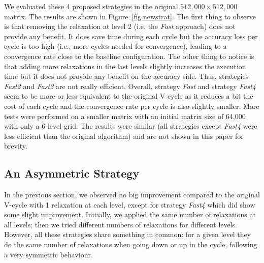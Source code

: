
We evaluated these 4 proposed strategies in the original $512,000\times
512,000$ matrix.  The results are shown in Figure~\ref{fig.newstrat}.  The
first thing to observe is that removing the relaxation at level 2 (i.e. the \emph{Fast} approach) does not
provide any benefit. It does save time during each cycle but the accuracy loss
per cycle is too high (i.e., more
cycles needed for convergence), leading to a convergence rate close to the baseline configuration. 
The other thing to notice is that adding more
relaxations in the last levels slightly increases the execution time but it
does not provide any benefit on the accuracy side. Thus, strategies
\emph{Fast2} and \emph{Fast3} are not really efficient.  Overall, strategy \emph{Fast} and strategy
\emph{Fast4} seem to be more or less equivalent to the original V cycle as it
reduces a bit the cost of each cycle and the convergence rate per cycle is also
slightly smaller.  More tests were performed on a smaller matrix with an
initial matrix size of 64,000 with only a 6-level grid. The results were
similar (all strategies except \emph{Fast4} were less efficient than the original algorithm) and are not shown in this paper for brevity.




\subsection{An Asymmetric Strategy}
\label{sec.assymetric}

In the previous section, we observed no big improvement compared to the
original V-cycle with 1 relaxation at each level, except for strategy
\emph{Fast4} which did show some slight improvement. Initially, we applied the
same number of relaxations at all levels; then we tried different numbers of
relaxations for different levels. However, all these strategies share something
in common: for a given level they do the same number of relaxations when going
down or up in the cycle, following a very symmetric behaviour.

